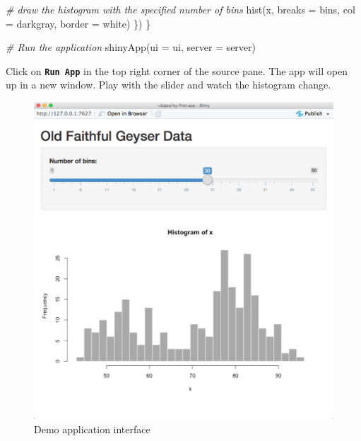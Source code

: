 \documentclass[
  oneside]{book}
\newenvironment{Shaded}{\begin{snugshade}}{\end{snugshade}}
\newcommand{\AttributeTok}[1]{\textcolor[rgb]{0.77,0.63,0.00}{#1}}
\newcommand{\CommentTok}[1]{\textcolor[rgb]{0.56,0.35,0.01}{\textit{#1}}}
\newcommand{\FunctionTok}[1]{\textcolor[rgb]{0.00,0.00,0.00}{#1}}
\newcommand{\NormalTok}[1]{#1}
\newcommand{\StringTok}[1]{\textcolor[rgb]{0.31,0.60,0.02}{#1}}
\begin{document}
\begin{warning}
\begin{Shaded}
\begin{Highlighting}[]
      \CommentTok{\# draw the histogram with the specified number of bins}
      \FunctionTok{hist}\NormalTok{(x, }\AttributeTok{breaks =}\NormalTok{ bins, }\AttributeTok{col =} \StringTok{\textquotesingle{}darkgray\textquotesingle{}}\NormalTok{, }\AttributeTok{border =} \StringTok{\textquotesingle{}white\textquotesingle{}}\NormalTok{)}
\NormalTok{   \})}
\NormalTok{\}}

\CommentTok{\# Run the application }
\FunctionTok{shinyApp}\NormalTok{(}\AttributeTok{ui =}\NormalTok{ ui, }\AttributeTok{server =}\NormalTok{ server)}
\end{Highlighting}
\end{Shaded}

\end{warning}

Click on \textbf{\texttt{Run\ App}} in the top right corner of the source pane. The app will open up in a new window. Play with the slider and watch the histogram change.

\begin{figure}

{\centering \includegraphics[width=1\linewidth]{images/demo_app/05-app-interface} 

}

\caption{Demo application interface}\label{fig:first-app-interface}
\end{figure}
\end{document}
